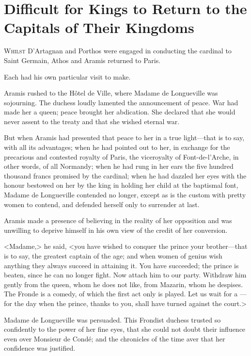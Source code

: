 \chapter[Difficult for Kings to Return to Their Capitals]{Difficult for Kings to Return to the Capitals of Their Kingdoms}

 \lettrine{W}{hilst} D'Artagnan and Porthos were engaged in conducting the cardinal to Saint Germain, Athos and Aramis returned to Paris.

\zz
Each had his own particular visit to make.

\zz
Aramis rushed to the Hôtel de Ville, where Madame de Longueville was sojourning. The duchess loudly lamented the announcement of peace. War had made her a queen; peace brought her abdication. She declared that she would never assent to the treaty and that she wished eternal war.

But when Aramis had presented that peace to her in a true light—that is to say, with all its advantages; when he had pointed out to her, in exchange for the precarious and contested royalty of Paris, the viceroyalty of Font-de-l'Arche, in other words, of all Normandy; when he had rung in her ears the five hundred thousand francs promised by the cardinal; when he had dazzled her eyes with the honour bestowed on her by the king in holding her child at the baptismal font, Madame de Longueville contended no longer, except as is the custom with pretty women to contend, and defended herself only to surrender at last.

Aramis made a presence of believing in the reality of her opposition and was unwilling to deprive himself in his own view of the credit of her conversion.

<Madame,> he said, <you have wished to conquer the prince your brother—that is to say, the greatest captain of the age; and when women of genius wish anything they always succeed in attaining it. You have succeeded; the prince is beaten, since he can no longer fight. Now attach him to our party. Withdraw him gently from the queen, whom he does not like, from Mazarin, whom he despises. The Fronde is a comedy, of which the first act only is played. Let us wait for a —for the day when the prince, thanks to you, shall have turned against the court.>

Madame de Longueville was persuaded. This Frondist duchess trusted so confidently to the power of her fine eyes, that she could not doubt their influence even over Monsieur de Condé; and the chronicles of the time aver that her confidence was justified.

